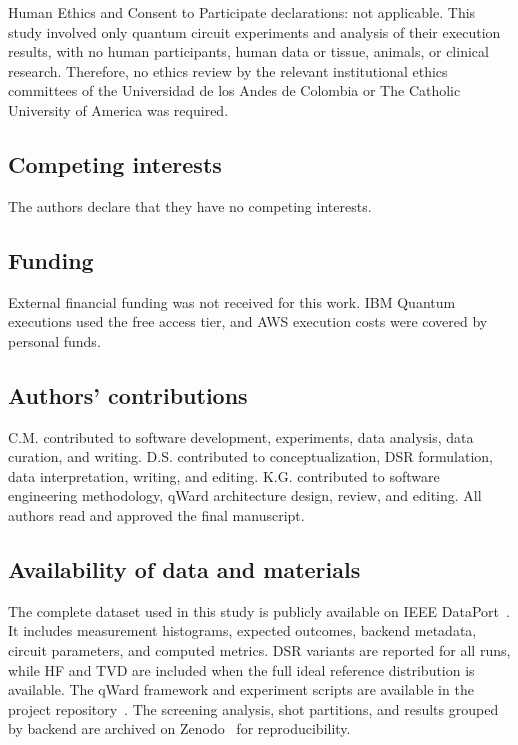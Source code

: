 \documentclass[pdflatex,sn-mathphys-num]{sn-jnl}
\theoremstyle{thmstyleone}%
\theoremstyle{thmstyletwo}%
\theoremstyle{thmstylethree}%
\begin{document}
Human Ethics and Consent to Participate declarations: not applicable. This study involved only quantum circuit experiments and analysis of their execution results, with no human participants, human data or tissue, animals, or clinical research. Therefore, no ethics review by the relevant institutional ethics committees of the Universidad de los Andes de Colombia or The Catholic University of America was required.

\subsection*{Competing interests}

The authors declare that they have no competing interests.

\subsection*{Funding}

External financial funding was not received for this work. IBM Quantum executions used the free access tier, and AWS execution costs were covered by personal funds.

\subsection*{Authors' contributions}

C.M. contributed to software development, experiments, data analysis, data curation, and writing. D.S. contributed to conceptualization, DSR formulation, data interpretation, writing, and editing. K.G. contributed to software engineering methodology, qWard architecture design, review, and editing. All authors read and approved the final manuscript.

\subsection*{Availability of data and materials}

The complete dataset used in this study is publicly available on IEEE DataPort~\cite{dsrdataset2026}. It includes measurement histograms, expected outcomes, backend metadata, circuit parameters, and computed metrics. DSR variants are reported for all runs, while HF and TVD are included when the full ideal reference distribution is available. The qWard framework and experiment scripts are available in the project repository~\cite{qward2026}. The screening analysis, shot partitions, and results grouped by backend are archived on Zenodo~\cite{dsrArtifact2026} for reproducibility.
\end{document}
